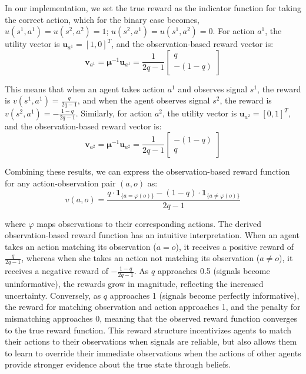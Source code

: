 \documentclass[a4paper,12pt]{report}
\begin{document}
In our implementation, we set the true reward as the indicator function for taking
the correct action, which for the binary case becomes, $u(s^{1}, a^{1}) = u(s^{2}
    , a^{2}) = 1$; $u(s^{2}, a^{1}) = u(s^{1}, a^{2}) = 0$. For action $a^{1}$, the
utility vector is $\bm{u}_{a^1}= [1, 0]^{T}$, and the observation-based reward vector
is:
\begin{equation}
    \bm{v}_{a^1}= \bm{\mu}^{-1}\bm{u}_{a^1}= \frac{1}{2q-1}
    \begin{bmatrix}
        q \\
        -(1-q)
    \end{bmatrix}
\end{equation}

This means that when an agent takes action $a^{1}$ and observes signal $s^{1}$,
the reward is $v(s^{1}, a^{1}) = \frac{q}{2q-1}$, and when the agent observes signal
$s^{2}$, the reward is $v(s^{2}, a^{1}) = -\frac{1-q}{2q-1}$. Similarly, for
action $a^{2}$, the utility vector is $\bm{u}_{a^2}= [0, 1]^{T}$, and the
observation-based reward vector is:
\begin{equation}
    \bm{v}_{a^2}= \bm{\mu}^{-1}\bm{u}_{a^2}= \frac{1}{2q-1}
    \begin{bmatrix}
        -(1-q) \\
        q
    \end{bmatrix}
\end{equation}

Combining these results, we can express the observation-based reward function for
any action-observation pair $(a, o)$ as:
\begin{equation}
    v(a, o) = \frac{q \cdot \mathbf{1}_{\{a = \varphi(o)\}}- (1-q) \cdot
        \mathbf{1}_{\{a \neq \varphi(o)\}}}{2q-1}
\end{equation}

where $\varphi$ maps observations to their corresponding actions. The derived
observation-based reward function has an intuitive interpretation. When an agent
takes an action matching its observation ($a = o$), it receives a positive
reward of $\frac{q}{2q-1}$, whereas when she takes an action not matching its observation
($a \neq o$), it receives a negative reward of $-\frac{1-q}{2q-1}$. As $q$ approaches
0.5 (signals become uninformative), the rewards grow in magnitude, reflecting the
increased uncertainty. Conversely, as $q$ approaches 1 (signals become perfectly
informative), the reward for matching observation and action approaches 1, and the
penalty for mismatching approaches 0, meaning that the observed reward function
converges to the true reward function. This reward structure incentivizes agents
to match their actions to their observations when signals are reliable, but also
allows them to learn to override their immediate observations when the actions
of other agents provide stronger evidence about the true state through beliefs.
\end{document}

